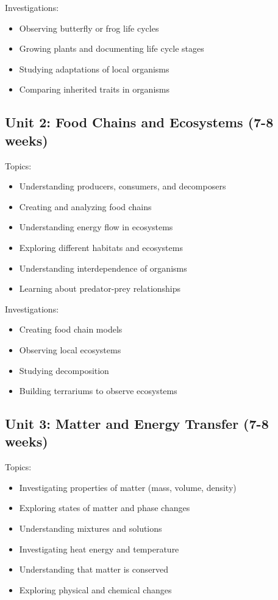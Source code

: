 \documentclass[11pt,letterpaper]{report}
\begin{document}
Investigations:
\begin{itemize}
\item Observing butterfly or frog life cycles
\item Growing plants and documenting life cycle stages
\item Studying adaptations of local organisms
\item Comparing inherited traits in organisms
\end{itemize}

\subsection{Unit 2: Food Chains and Ecosystems (7-8 weeks)}

Topics:
\begin{itemize}
\item Understanding producers, consumers, and decomposers
\item Creating and analyzing food chains
\item Understanding energy flow in ecosystems
\item Exploring different habitats and ecosystems
\item Understanding interdependence of organisms
\item Learning about predator-prey relationships
\end{itemize}

Investigations:
\begin{itemize}
\item Creating food chain models
\item Observing local ecosystems
\item Studying decomposition
\item Building terrariums to observe ecosystems
\end{itemize}

\subsection{Unit 3: Matter and Energy Transfer (7-8 weeks)}

Topics:
\begin{itemize}
\item Investigating properties of matter (mass, volume, density)
\item Exploring states of matter and phase changes
\item Understanding mixtures and solutions
\item Investigating heat energy and temperature
\item Understanding that matter is conserved
\item Exploring physical and chemical changes
\end{itemize}
\end{document}
